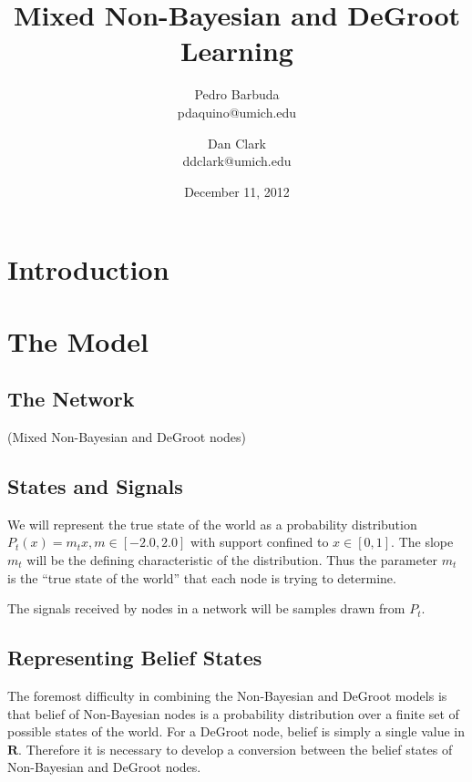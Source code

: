 \documentclass[a4paper,12pt]{article}
\begin{document}
\title{Mixed Non-Bayesian and DeGroot Learning}
\author{Pedro Barbuda\\pdaquino@umich.edu \and Dan Clark\\ddclark@umich.edu}
\date{December 11, 2012}

\maketitle

\section{Introduction}

\section{The Model}

\subsection{The Network}

(Mixed Non-Bayesian and DeGroot nodes)

\subsection{States and Signals}

We will represent the true state of the world as a probability 
distribution $P_t(x) = m_{t}x, m \in [-2.0, 2.0]$ with support confined to $x \in [0,1]$.  The slope $m_t$ will be the defining characteristic of the distribution.  Thus the parameter $m_t$ is the ``true state of the world'' that each node is trying to determine.

The signals received by nodes in a network will be samples drawn from $P_t$.

\subsection{Representing Belief States}

The foremost difficulty in combining the Non-Bayesian and DeGroot models is that belief of Non-Bayesian nodes is a probability distribution over a finite set of possible states of the world.  For a DeGroot node, belief is simply a single value in $\mathbf{R}$.  Therefore it is necessary to develop a conversion between the belief states of Non-Bayesian and DeGroot nodes.
\end{document}
